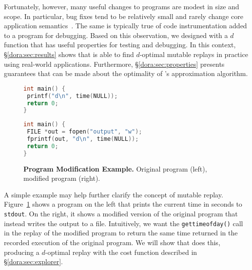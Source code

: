 Fortunately, however, many useful changes to programs are modest in size and scope.
In particular, bug fixes tend to be relatively small and rarely change
core application semantics~\cite{delta,mreplay-feas}.  The same is
typically true of code instrumentation added to a program for
debugging. Based on this observation, we designed {\dora} with a
$d$ function that has useful properties for testing and debugging.  In
this context, \S\ref{dora:sec:results} shows that {\dora} is able
to find $d$-optimal mutable replays in practice using real-world
applications. Furthermore, \S\ref{dora:sec:properties} presents
guarantees that can be made about the optimality of {\dora}'s
approximation algorithm.


\begin{figure}
\centering
\centering
\begin{minipage}{.4\textwidth}
  \begin{rbox}
\begin{lstlisting}[language=C]
int main() {
 printf("d\n", time(NULL));
 return 0;
}
\end{lstlisting}
  \end{rbox}
  \vspace{1em}
\end{minipage}
\hspace{1em}
\begin{minipage}{.4\textwidth}
  \begin{rbox}
\begin{lstlisting}[language=C]
int main() {
 FILE *out = fopen("output", "w");
 fprintf(out, "d\n", time(NULL));
 return 0;
}
\end{lstlisting}
  \end{rbox}
\end{minipage}
\caption{{\bf Program Modification Example.} Original program (left), modified program (right).}
\label{dora:fig:code-example}
\end{figure}


A simple example may help further clarify the concept of
mutable replay.  Figure~\ref{dora:fig:code-example} shows a program on the left that
prints the current time in seconds to {\tt stdout}. On the right, it
shows a modified version of the original program that instead writes the output to a file.
Intuitively, we want the {\tt gettimeofday()} call in the replay of the
modified program to return the same time returned in the recorded
execution of the original program.
We will show that {\dora} does this, producing a $d$-optimal replay
with the cost function described in \S\ref{dora:sec:explorer}. 

